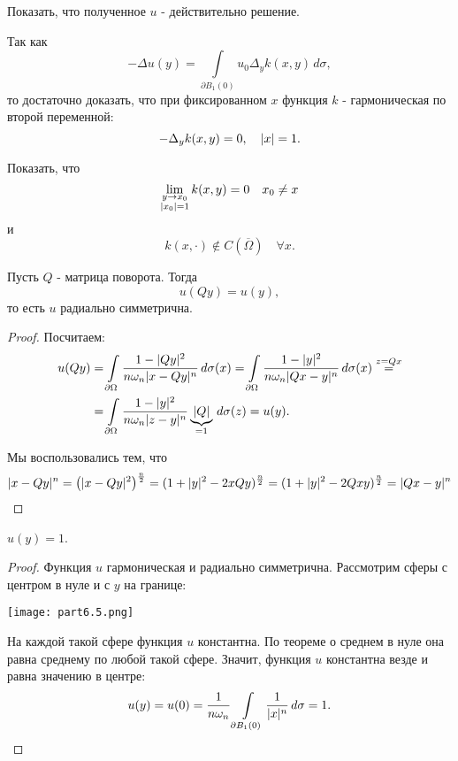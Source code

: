 \begin{exercise} Показать, что полученное $u$ - действительно решение.
\end{exercise}
\begin{note}Так как
$$- \Delta u(y) = \int \limits_{\partial B_1 (0)} u_0 \Delta_y k(x, y) \, d\sigma,$$
то достаточно доказать, что при фиксированном $x$ функция $k$ - гармоническая по второй переменной:
$$ - \Delta_y k(x,y) = 0, \quad \lvert x\rvert = 1.$$
\end{note}

\begin{exercise} Показать, что
$$ \lim_{\substack{y \to x_0 \\ \lvert x_0\rvert = 1}} k(x, y) = 0 \quad x_0 \neq x$$
и
$$ k( x, \cdot) \notin C(\overline{\Omega}) \quad \forall x.$$
\end{exercise}

\begin{note}Пусть $Q$ - матрица поворота. Тогда
$$ u(Qy) = u(y),$$
то есть $u$ радиально симметрична.
\end{note}
\begin{proof}
Посчитаем:
\begin{align*}
	u(Qy) &= \int \limits_{\partial \Omega} \frac {1 - \lvert Qy\rvert^2} {n \omega_n \lvert x-Qy\rvert^n} \, d\sigma(x) = \int \limits_{\partial \Omega} \frac {1 - \lvert y\rvert^2} {n \omega_n \lvert Qx-y\rvert^n} \, d\sigma(x) \stackrel{z = Qx} = \\
	&= \int \limits_{\partial \Omega} \frac {1 - \lvert y\rvert^2} {n \omega_n \lvert z - y\rvert^n} \underbrace {\lvert Q\rvert}_{=1} \, d\sigma(z) = u(y). 
\end{align*}

Мы воспользовались тем, что
\begin{align*}
	\lvert x-Qy\rvert^n = \left( \lvert x-Qy\rvert^2 \right)^{\frac {n} {2}} = (1 + \lvert y\rvert^2 - 2 x Q y)^{\frac {n} {2}} = (1 + \lvert y\rvert^2 - 2Qxy)^{\frac {n} {2}} = \lvert Qx - y\rvert^n
\end{align*}

\end{proof}

\begin{note} $u(y) = 1$.
\end{note}
\begin{proof}
Функция $u$ гармоническая и радиально симметрична. Рассмотрим сферы с центром в нуле и с $y$ на границе:
\begin{center}
\texttt{[image: part6.5.png]}
\end{center}
На каждой такой сфере функция $u$ константна. По теореме о среднем в нуле она равна среднему по любой такой сфере. Значит, функция $u$ константна везде и равна значению в центре:
$$ u(y) = u(0) = \frac {1} {n \omega_n} \int \limits_{\partial B_1 (0)} \frac {1} {\lvert x\rvert^n} \, d\sigma = 1.$$

\end{proof}

